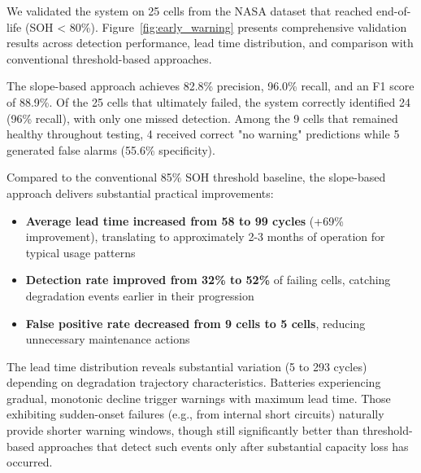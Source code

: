 \documentclass[5p,times,authoryear]{elsarticle}
\begin{document}
We validated the system on 25 cells from the NASA dataset that reached end-of-life (SOH < 80\%). Figure~\ref{fig:early_warning} presents comprehensive validation results across detection performance, lead time distribution, and comparison with conventional threshold-based approaches.



The slope-based approach achieves 82.8\% precision, 96.0\% recall, and an F1 score of 88.9\%. Of the 25 cells that ultimately failed, the system correctly identified 24 (96\% recall), with only one missed detection. Among the 9 cells that remained healthy throughout testing, 4 received correct "no warning" predictions while 5 generated false alarms (55.6\% specificity).

Compared to the conventional 85\% SOH threshold baseline, the slope-based approach delivers substantial practical improvements:
\begin{itemize}
\item \textbf{Average lead time increased from 58 to 99 cycles} (+69\% improvement), translating to approximately 2-3 months of operation for typical usage patterns
\item \textbf{Detection rate improved from 32\% to 52\%} of failing cells, catching degradation events earlier in their progression
\item \textbf{False positive rate decreased from 9 cells to 5 cells}, reducing unnecessary maintenance actions
\end{itemize}

The lead time distribution reveals substantial variation (5 to 293 cycles) depending on degradation trajectory characteristics. Batteries experiencing gradual, monotonic decline trigger warnings with maximum lead time. Those exhibiting sudden-onset failures (e.g., from internal short circuits) naturally provide shorter warning windows, though still significantly better than threshold-based approaches that detect such events only after substantial capacity loss has occurred.
\end{document}
